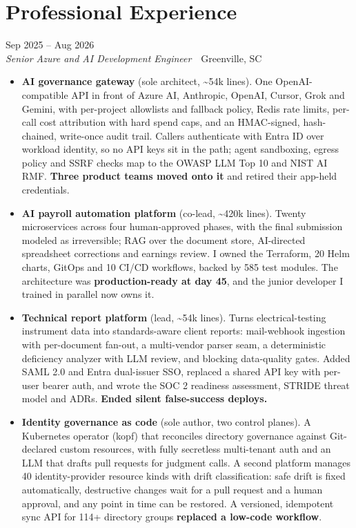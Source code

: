 \documentclass[10pt,letterpaper]{article}
\newcommand{\szmeta}{\fontsize{8pt}{10pt}\selectfont}
\begin{document}
\section*{Professional Experience}
\vspace{0pt}
 \hfill {\color{muted}\szmeta Sep 2025 – Aug 2026}\\[1pt]
{\itshape Senior Azure and AI Development Engineer}{\color{muted}\ \textbullet\ Greenville, SC}
\vspace{2pt}
\begin{itemize}
\item \textbf{AI governance gateway} {\color{muted}(sole architect, \textasciitilde{}54k lines)}. One OpenAI-compatible API in front of Azure AI, Anthropic, OpenAI, Cursor, Grok and Gemini, with per-project allowlists and fallback policy, Redis rate limits, per-call cost attribution with hard spend caps, and an HMAC-signed, hash-chained, write-once audit trail. Callers authenticate with Entra ID over workload identity, so no API keys sit in the path; agent sandboxing, egress policy and SSRF checks map to the OWASP LLM Top 10 and NIST AI RMF. \textbf{Three product teams moved onto it} and retired their app-held credentials.
\item \textbf{AI payroll automation platform} {\color{muted}(co-lead, \textasciitilde{}420k lines)}. Twenty microservices across four human-approved phases, with the final submission modeled as irreversible; RAG over the document store, AI-directed spreadsheet corrections and earnings review. I owned the Terraform, 20 Helm charts, GitOps and 10 CI/CD workflows, backed by 585 test modules. The architecture was \textbf{production-ready at day 45}, and the junior developer I trained in parallel now owns it.
\item \textbf{Technical report platform} {\color{muted}(lead, \textasciitilde{}54k lines)}. Turns electrical-testing instrument data into standards-aware client reports: mail-webhook ingestion with per-document fan-out, a multi-vendor parser seam, a deterministic deficiency analyzer with LLM review, and blocking data-quality gates. Added SAML 2.0 and Entra dual-issuer SSO, replaced a shared API key with per-user bearer auth, and wrote the SOC 2 readiness assessment, STRIDE threat model and ADRs. \textbf{Ended silent false-success deploys.}
\item \textbf{Identity governance as code} {\color{muted}(sole author, two control planes)}. A Kubernetes operator (kopf) that reconciles directory governance against Git-declared custom resources, with fully secretless multi-tenant auth and an LLM that drafts pull requests for judgment calls. A second platform manages 40 identity-provider resource kinds with drift classification: safe drift is fixed automatically, destructive changes wait for a pull request and a human approval, and any point in time can be restored. A versioned, idempotent sync API for 114+ directory groups \textbf{replaced a low-code workflow}.

\end{itemize}
\end{document}
